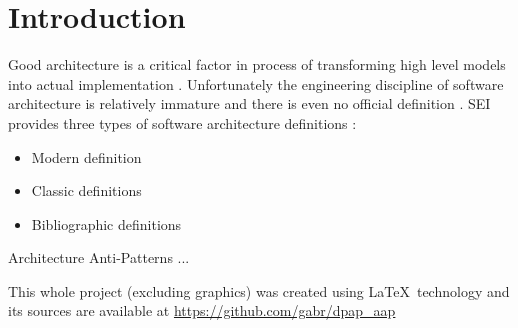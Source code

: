 \section{Introduction}
Good architecture is a critical factor in process of transforming high level models into actual implementation \cite{Nordic}. Unfortunately the engineering discipline of software architecture is relatively immature and there is even no official definition \cite{ArchitekturaWikiPl}.
SEI provides three types of software architecture definitions \cite{SEI}:
\begin{itemize}
    \item Modern definition
    \item Classic definitions
    \item Bibliographic definitions
\end{itemize}

Architecture Anti-Patterns ...

\begin{bottompar}
This whole project (excluding graphics) was created using \LaTeX \ technology and its sources are available at \url{https://github.com/gabr/dpap_aap}

\ 
\end{bottompar}